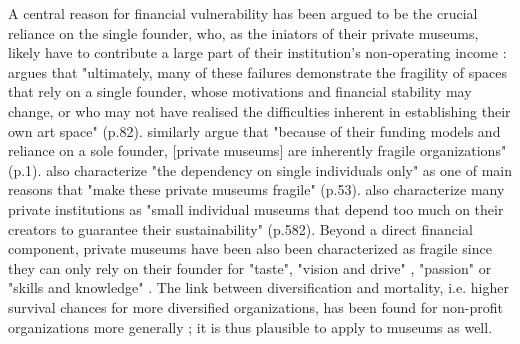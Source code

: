 \documentclass[12pt]{article}
\begin{document}
A central reason for financial vulnerability has been argued to be the crucial reliance on the single founder, who, as the iniators of their private museums, likely have to contribute a large part of their institution's non-operating income \parencite{Frey_Meier_2002_beyeler}:
\textcite{Adam_2021_rise} argues that "ultimately, many of these failures demonstrate the fragility of spaces that rely on a single founder, whose motivations and financial stability may change, or who may not have realised the difficulties inherent in establishing their own art space" (p.82).
\textcite{Velthuis_Gera_2024_fragility} similarly argue that "because of their funding models and reliance on a sole founder, [private museums] are inherently fragile organizations" (p.1).
\textcite{Bechtler_Imhof_2018_future} also characterize "the dependency on single individuals only" as one of main reasons that "make these private museums fragile" (p.53).
\cite{StylianouLambert_etal_2014_museums} also characterize many private institutions as "small individual museums that depend too much on their creators to guarantee their sustainability" (p.582).
Beyond a direct financial component, private museums have been also been characterized as fragile since they can only rely on their founder for "taste", "vision and drive" \parencite[p.77]{Adam_2021_rise}, "passion" \parencite[p.234]{Walker_2019_collector} or "skills and knowledge" \parencite[p.580]{StylianouLambert_etal_2014_museums}.
The link between diversification and mortality, i.e. higher survival chances for more diversified organizations, has been found for non-profit organizations more generally \parencite{Fernandez_2007_dissolution,Bielefeld_1994_survival,Hager_2001_vulnerability,Lu_Shon_Zhang_2019_dissolution}; it is thus plausible to apply to museums as well.
\end{document}
